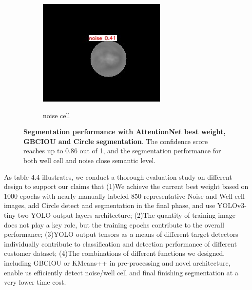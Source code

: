 \begin{figure}[t]
\begin{center}
		\begin{subfigure}[b]{0.25\textwidth}
			\includegraphics[width=\textwidth]{thesis-template-master/images/bestweightonnoise3.jpg}
			\label{fig:Good Cell}
			\caption{noise cell}
		\end{subfigure}
	\end{center}
	\caption{ \textbf{Segmentation performance with AttentionNet best weight, GBCIOU and Circle segmentation}. The confidence score reaches up to 0.86 out of 1, and the segmentation performance for both well cell and noise close semantic level.}
	\label{fig:4.8}
\end{figure}

As table 4.4 illustrates, we conduct a thorough evaluation study on different design to support our claims that
(1)We achieve the current best weight based on 1000 epochs with nearly manually labeled 850 representative Noise and Well cell images, add Circle detect and segmentation in the final phase, and use YOLOv3-tiny \cite{18} two YOLO output layers architecture;
(2)The quantity of training image does not play a key role, but the training epochs contribute to the overall  performance;
(3)YOLO output tensors as a means of different target detectors individually contribute to classification and detection performance of different customer dataset;
(4)The combinations of different functions we designed, including GBCIOU or KMeans++ in pre-processing and novel architecture, enable us efficiently detect noise/well cell and final finishing segmentation at a very lower time cost.


